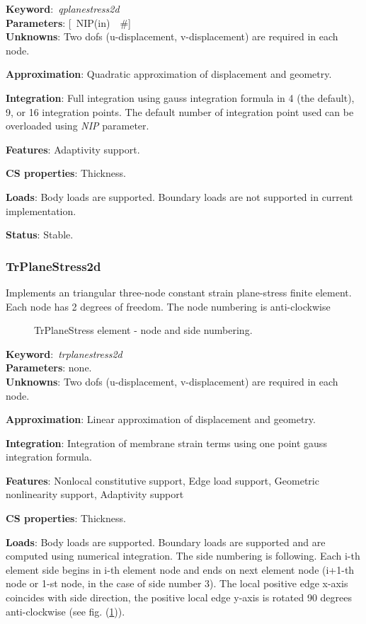 \documentclass[12pt,dvips]{article}
\newcommand{\descitem}[1]{{\noindent \bf #1}:}
\newcommand{\elemkeyword}[1]{\descitem{Keyword}~{\em #1}}
\newcommand{\elemparam}[2]{{{#1\tiny (#2)}~~\#}}
\newcommand{\optelemparam}[2]{{[~\elemparam{#1}{#2}]}}
\newcommand{\param}[1]{{\it #1}}
\begin{document}
\elemkeyword{qplanestress2d}\\
\descitem{Parameters} \optelemparam{NIP}{in}\\
\descitem{Unknowns}
Two dofs (u-displacement, v-displacement) are required in each node.

\descitem{Approximation} Quadratic approximation of displacement and
geometry.

\descitem{Integration}
Full integration using gauss integration formula
in 4 (the default), 9, or 16 integration points. The default number of
integration point used can be overloaded using \param{NIP} parameter.

\descitem{Features} Adaptivity support.

\descitem{CS properties} Thickness. 

\descitem{Loads} Body loads are supported. Boundary loads are
not supported in current implementation.

\descitem{Status} Stable.

\subsubsection{TrPlaneStress2d}
Implements an triangular three-node  constant strain plane-stress  
finite element. Each node has 2 degrees of freedom.
The node numbering is anti-clockwise

\begin{figure}[htb]
\begin{center}\end{center}
\caption{TrPlaneStress element - node and side numbering.}
\label{TrPlanestressfig}
\end{figure}

\elemkeyword{trplanestress2d}\\
\descitem{Parameters} none.\\
\descitem{Unknowns}
Two dofs (u-displacement, v-displacement) are required in each node.

\descitem{Approximation} Linear approximation of displacement and
geometry.

\descitem{Integration}
Integration of membrane strain terms using one point gauss integration formula.

\descitem{Features} Nonlocal constitutive support, Edge load
support, Geometric nonlinearity support, Adaptivity support

\descitem{CS properties} Thickness. 

\descitem{Loads} Body loads are supported. Boundary loads are
supported and are computed  using numerical integration. The side numbering is
following. Each i-th element side begins in i-th element node and
ends on next element node (i+1-th node or 1-st node, in the case of 
side number 3). The local positive edge x-axis coincides with side
direction, the positive local edge y-axis is rotated 90 degrees
anti-clockwise (see fig. (\ref{TrPlanestressfig})).
\end{document}
